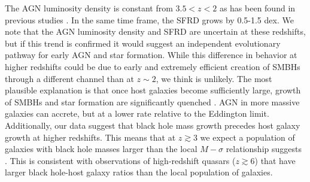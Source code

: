 \documentclass[twocolumn, trackchanges]{aastex63}
\newcommand{\jr}[1]{{\color{purple}[JR: #1]}}
\newcommand{\ml}[1]{{\color{green}[ML: #1]}}
\begin{document}
The AGN luminosity density is constant from $3.5 < z < 2$ as has been found in previous studies \citep{lacy_spitzer_2015, ranalli_210_2016}.
In the same time frame, the SFRD grows by 0.5-1.5 dex.
We note that the AGN luminosity density and SFRD are uncertain at these redshifts, but if this trend is confirmed it would suggest an independent evolutionary pathway for early AGN and star formation.
While this difference in behavior at higher redshifts could be due to early and extremely efficient creation of SMBHs through a different channel than at $z\sim 2$, we think is unlikely.
The most plausible explanation is that once host galaxies become sufficiently large, growth of SMBHs and star formation are significantly quenched \citep{peng_mass_2010}.
AGN in more massive galaxies can accrete, but at a lower rate relative to the Eddington limit.
Additionally, our data suggest that black hole mass growth precedes host galaxy growth at higher redshifts.
This means that at $z \gtrsim 3$ we expect a population of galaxies with black hole masses larger than the local $M-\sigma$ relationship suggests \citep{magorrian_demography_1998, kormendy_coevolution_2013, merritt_mbh-sigma_2001}.
This is consistent with observations of high-redshift quasars ($z\gtrsim 6$) \cite[eg,]{2018ApJ...854...97D, neeleman_kinematics_2021} that have larger black hole-host galaxy ratios than the local population of galaxies.


\end{document}
